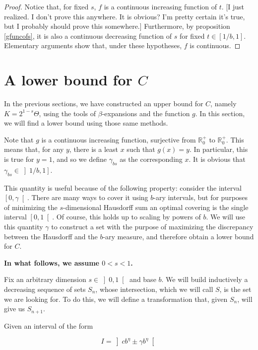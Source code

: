 \documentclass[11pt, reqno]{amsart}
\newcommand{\R}{\mathbb{R}}
\begin{document}
\begin{proof}
Notice that, for fixed $s$, $f$ is a continuous increasing function of $t$. [I just realized. I don't prove this anywhere. It is obvious? I'm pretty certain it's true, but I probably should prove this somewhere.] Furthermore, by proposition \ref{gfuncofs}, it is also a continuous decreasing function of $s$ for fixed $t \in \left[1/b, 1 \right]$. Elementary arguments show that, under these hypotheses, $f$ is continuous. %
\end{proof}

\section{A lower bound for $C$}\label{seclowerbound}

In the previous sections, we have constructed an upper bound for $C$, namely $K = 2^{1-s} \Theta$, using the tools of $\beta$-expansions and the function $g$. In this section, we will find a lower bound using those same methods.

Note that $g$ is a continuous increasing function, surjective from $\R^+_0$ to $\R^+_0$. This means that, for any $y$, there is a least $x$ such that $g(x) = y$. In particular, this is true for $y = 1$, and so we define $\gamma_{bs}$ as the corresponding $x$. It is obvious that $\gamma_{bs} \in \left] 1/b, 1 \right]$.

This quantity is useful because of the following property: consider the interval $\left[0, \gamma \right[$. There are many ways to cover it using $b$-ary intervals, but for purposes of minimizing the $s$-dimensional Hausdorff sum an optimal covering is the single interval $\left[0, 1 \right[$. Of course, this holds up to scaling by powers of $b$. We will use this quantity $\gamma$ to construct a set with the purpose of maximizing the discrepancy between the Hausdorff and the $b$-ary measure, and therefore obtain a lower bound for $C$.

\textbf{In what follows, we assume $0 < s < 1$.}

Fix an arbitrary dimension $s \in \left]0, 1 \right[$ and base $b$. We will build inductively a decreasing sequence of sets $S_n$, whose intersection, which we will call $S$, is the set we are looking for. To do this, we will define a transformation that, given $S_n$, will give us $S_{n+1}$.

Given an interval of the form

\begin{equation}\label{gableinterval}
I = \left] c b^\eta \pm \gamma b^\eta \right[
\end{equation}
\end{document}
